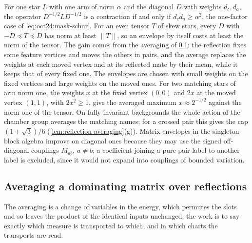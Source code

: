 \begin{remark}\label{rem:envelope-gain}
For one star $L$ with one arm of norm $\alpha$ and the diagonal $D$ with weights
$d_c,d_a$, the operator $D^{-1/2}LD^{-1/2}$ is a contraction if and only if
$d_cd_a\ge\alpha^2$, the one-factor case of \eqref{eq:oct24:mask-schur}.
For an even tensor $T$ of skew stars, every $D$ with
$-D\preceq T\preceq D$ has norm at least $\|T\|$, so
an envelope by itself costs at least the norm of the tensor. The gain comes from
the averaging of \cref{subsec:reflection-averaging}: the reflection fixes some
feature vertices and moves the others in pairs, and the average replaces the weights at each moved vertex and at its reflected mate by their mean, while it keeps that of every fixed one. The
envelopes are chosen with small weights on the fixed vertices and large weights
on the moved ones. For two matching stars of arm norm one, the weights $x$ at
the fixed vertex $(0,0)$ and $2x$ at the moved vertex $(1,1)$, with
$2x^2\ge1$, give the averaged maximum $x\approx2^{-1/2}$ against the norm one of
the tensor. On fully invariant backgrounds the whole action of the chamber group
averages the matching names; for a crossed pair this gives the cap
$(1+\sqrt3)/6$ (\cref{lem:reflection-averaging}(g)). Matrix envelopes in the
singleton block algebra improve on diagonal ones because they may use the signed
off-diagonal couplings $M_{ab}$, $a\ne b$; a coefficient joining a pure-pair label to
another label is excluded, since it would not expand into couplings of bounded
variation.
\end{remark}

\subsection{Averaging a dominating matrix over reflections}\label{subsec:reflection-averaging}

The averaging is a change of variables in the energy, which permutes the slots
and so leaves the product of the identical inputs unchanged; the work is to
say exactly which measure is transported to which, and in which charts the
transports are read.

